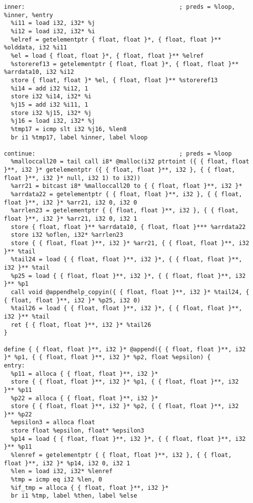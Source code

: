 \documentclass[main.tex]{subfiles}
\begin{document}
{\begin{lstlisting}
inner:                                            ; preds = %loop, %inner, %entry
  %i11 = load i32, i32* %j
  %i12 = load i32, i32* %i
  %elref = getelementptr { float, float }*, { float, float }** %olddata, i32 %i11
  %el = load { float, float }*, { float, float }** %elref
  %storeref13 = getelementptr { float, float }*, { float, float }** %arrdata10, i32 %i12
  store { float, float }* %el, { float, float }** %storeref13
  %i14 = add i32 %i12, 1
  store i32 %i14, i32* %i
  %j15 = add i32 %i11, 1
  store i32 %j15, i32* %j
  %j16 = load i32, i32* %j
  %tmp17 = icmp slt i32 %j16, %len8
  br i1 %tmp17, label %inner, label %loop

continue:                                         ; preds = %loop
  %malloccall20 = tail call i8* @malloc(i32 ptrtoint ({ { float, float }**, i32 }* getelementptr ({ { float, float }**, i32 }, { { float, float }**, i32 }* null, i32 1) to i32))
  %arr21 = bitcast i8* %malloccall20 to { { float, float }**, i32 }*
  %arrdata22 = getelementptr { { float, float }**, i32 }, { { float, float }**, i32 }* %arr21, i32 0, i32 0
  %arrlen23 = getelementptr { { float, float }**, i32 }, { { float, float }**, i32 }* %arr21, i32 0, i32 1
  store { float, float }** %arrdata10, { float, float }*** %arrdata22
  store i32 %oflen, i32* %arrlen23
  store { { float, float }**, i32 }* %arr21, { { float, float }**, i32 }** %tail
  %tail24 = load { { float, float }**, i32 }*, { { float, float }**, i32 }** %tail
  %p25 = load { { float, float }**, i32 }*, { { float, float }**, i32 }** %p1
  call void @appendhelp_copyin({ { float, float }**, i32 }* %tail24, { { float, float }**, i32 }* %p25, i32 0)
  %tail26 = load { { float, float }**, i32 }*, { { float, float }**, i32 }** %tail
  ret { { float, float }**, i32 }* %tail26
}

define { { float, float }**, i32 }* @append({ { float, float }**, i32 }* %p1, { { float, float }**, i32 }* %p2, float %epsilon) {
entry:
  %p11 = alloca { { float, float }**, i32 }*
  store { { float, float }**, i32 }* %p1, { { float, float }**, i32 }** %p11
  %p22 = alloca { { float, float }**, i32 }*
  store { { float, float }**, i32 }* %p2, { { float, float }**, i32 }** %p22
  %epsilon3 = alloca float
  store float %epsilon, float* %epsilon3
  %p14 = load { { float, float }**, i32 }*, { { float, float }**, i32 }** %p11
  %lenref = getelementptr { { float, float }**, i32 }, { { float, float }**, i32 }* %p14, i32 0, i32 1
  %len = load i32, i32* %lenref
  %tmp = icmp eq i32 %len, 0
  %if_tmp = alloca { { float, float }**, i32 }*
  br i1 %tmp, label %then, label %else


\end{lstlisting}}
\end{document}
